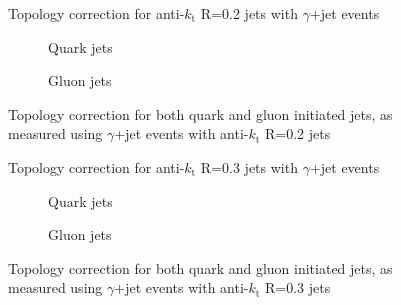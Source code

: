\clearpage
\begin{figure}[!ht]
 \centering
 \caption[Topology correction for anti-$k_{\mathrm t}$ R=0.2 jets with $\gamma$+jet events]
 {\small Topology correction for anti-$k_{\mathrm t}$ R=0.2 jets with $\gamma$+jet events}
 \label{plot:GJetTopoCorr2App}
\end{figure}

\begin{figure}[!ht]
 \centering
 \begin{subfigure}{.5\textwidth}
  \centering
  \caption{Quark jets}
 \end{subfigure}%
 \begin{subfigure}{.5\textwidth}
  \centering
  \caption{Gluon jets}
 \end{subfigure}
 \caption[Quark/gluon jet topology correction, anti-$k_{\mathrm t}$ R=0.2, $\gamma$+jet]
 {\small Topology correction for both quark and gluon initiated jets, as measured using $\gamma$+jet events with anti-$k_{\mathrm t}$ R=0.2 jets}
 \label{plot:GJetTopoCorrFlav2App}
\end{figure}

\clearpage
\begin{figure}[!ht]
 \centering
 \caption[Topology correction for anti-$k_{\mathrm t}$ R=0.3 jets with $\gamma$+jet events]
 {\small Topology correction for anti-$k_{\mathrm t}$ R=0.3 jets with $\gamma$+jet events}
 \label{plot:GJetTopoCorr3App}
\end{figure}

\begin{figure}[!ht]
 \centering
 \begin{subfigure}{.5\textwidth}
  \centering
  \caption{Quark jets}
 \end{subfigure}%
 \begin{subfigure}{.5\textwidth}
  \centering
  \caption{Gluon jets}
 \end{subfigure}
 \caption[Quark/gluon jet topology correction, anti-$k_{\mathrm t}$ R=0.3, $\gamma$+jet]
 {\small Topology correction for both quark and gluon initiated jets, as measured using $\gamma$+jet events with anti-$k_{\mathrm t}$ R=0.3 jets}
 \label{plot:GJetTopoCorrFlav3App}
\end{figure}


